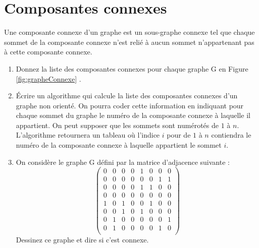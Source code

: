\documentclass{article}[12pt]
\begin{document}
\section*{Composantes connexes}
Une composante connexe d’un graphe est un sous-graphe connexe tel que chaque sommet de la composante connexe n’est relié à aucun sommet n’appartenant pas à cette composante connexe. 
\begin{enumerate} 
\item Donnez la liste des composantes connexes pour chaque graphe G en Figure \ref{fig:grapheConnexe} .
\item Écrire un algorithme qui calcule la liste des composantes connexes d’un graphe non orienté. On pourra coder cette information en indiquant pour chaque sommet du graphe le numéro de la composante connexe à laquelle il appartient. On peut supposer que les sommets sont numérotés de $1$ à $n$. L'algorithme retournera un tableau où l'indice $i$ pour de $1$ à $n$ contiendra le numéro de la composante connexe à laquelle appartient le sommet $i$.


\item On considère le graphe G défini par la matrice d’adjacence suivante :
\[
\begin{pmatrix}
0 &0 &0 &0 &1& 0 & 0 & 0 \\
0 &0 &0 &0 &0& 0 & 1 & 1 \\
0 &0 &0 &0 &1& 1 & 0 & 0  \\
0 &0 &0 &0 &0& 0 & 0 & 0  \\
1 &0 &1 &0 &0& 1 & 0 & 0  \\
0 &0 &1 &0 &1& 0 & 0 & 0  \\
0 &1 &0 &0 &0& 0 & 0 & 1 \\
0 &1 &0 &0 &0& 0 & 1 & 0  \\
\end{pmatrix}
\]
Dessinez ce graphe et dire si c'est connexe.
\end{enumerate}
\end{document}
